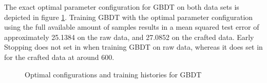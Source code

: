 The exact optimal parameter configuration for GBDT on both data sets is depicted in figure \ref{fig:GBDT_Optimal}. Training GBDT with the optimal parameter configuration using the full available amount of samples results in a mean squared test error of approximately 25.1384 on the raw data, and 27.0852 on the crafted data. Early Stopping does not set in when training GBDT on raw data, whereas it does set in for the crafted data at around 600. 
\begin{figure}[h]
	\centering
	\caption{Optimal configurations and training histories for GBDT}
	\label{fig:GBDT_Optimal}
\end{figure}

